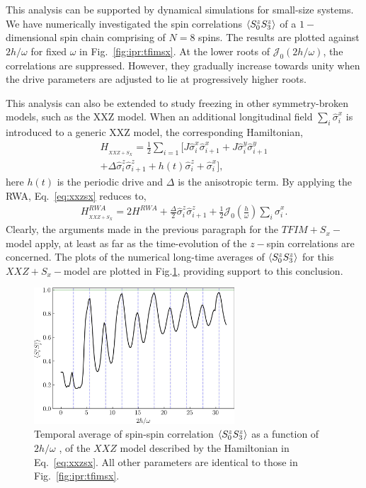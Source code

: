 \documentclass[%
reprint,
superscriptaddress,
amsmath,amssymb,
aps,
prb,
showkeys,
]{revtex4-2}
\begin{document}
This analysis can be supported by dynamical simulations for small-size systems. We have numerically investigated the spin correlations $\expval{S^z_0 S^z_3}$ of a $1-$dimensional spin chain comprising of $N=8$ spins. The results are plotted against $2h/\omega$ for fixed $\omega$ in Fig.~\ref{fig:ipr:tfimsx}. At the lower roots of $\mathcal{J}_0\left(2h/\omega\right)$,  the correlations are suppressed. However,  they  gradually increase towards unity when the drive parameters are adjusted to lie at progressively higher roots.

This analysis can also be extended to study freezing in  other symmetry-broken models, such as the XXZ model. When an additional longitudinal field $\sum_i\hat{\sigma}^x_i$ is introduced to a generic XXZ model, the corresponding Hamiltonian,
\begin{multline}
H_{_{XXZ+S_{X}}} = \frac12 \sum_{i=1} \bigg[ J \hat{\sigma}^x_i \hat{\sigma}^x_{i+1} +J  \hat{\sigma}^y_i \hat{\sigma}^y_{i+1}\\ + \Delta  \hat{\sigma}^z_i \hat{\sigma}^z_{i+1} + h(t)  \hat{\sigma}^z_i + \hat{\sigma}^x_i\bigg],
\label{eq:xxzsx}
\end{multline}
here $h(t)$ is the periodic drive and $\Delta$ is the anisotropic term. By applying the RWA, Eq.~\eqref{eq:xxzsx} reduces to,
\begin{multline}
	H^{RWA}_{_{XXZ+S_{X}}} = 2 H^{RWA} + \frac{\Delta}{2}  \hat{\sigma}^z_i \hat{\sigma}^z_{i+1} +  \frac12 \mathcal{J}_0\left(\frac{h}{\omega}\right)\sum_i\hat{\sigma}^x_i.
	\label{eq:xxzsx}
\end{multline} 
Clearly, the arguments made in the previous paragraph for the $TFIM+S_x-$model apply, at least as far as the time-evolution of the $z-$spin correlations are concerned. The plots of the numerical long-time averages of $\expval{S^z_0S^z_3}$ for this $XXZ+S_x-$model are plotted
 in Fig.\ref{fig:xxzsx}, providing support to this conclusion.
\begin{figure}[t!]
	\centering
	\includegraphics[width = 7.5cm]{corrN8sz0sz3avg_xxz_sxan0p5.jpeg}
	\caption{Temporal average of spin-spin correlation $\expval{S^z_0 S^z_3}$ as a function of $2h/\omega$ , of the $XXZ$ model described by the Hamiltonian in Eq.~\ref{eq:xxzsx}. All other parameters are identical to those in Fig.~\ref{fig:ipr:tfimsx}.}
	\label{fig:xxzsx}
\end{figure}
\end{document}
